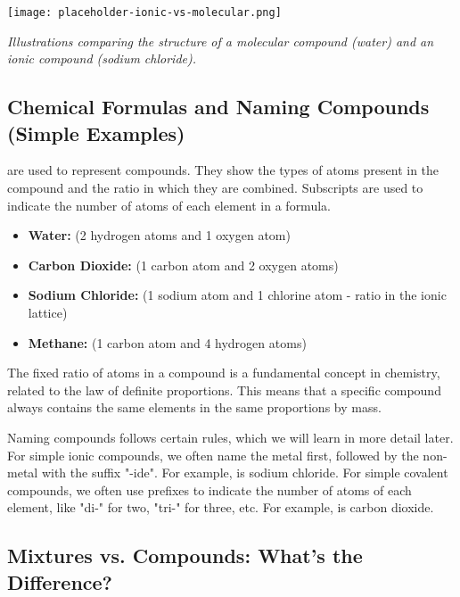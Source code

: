 \begin{marginfigure}
\texttt{[image: placeholder-ionic-vs-molecular.png]}
\caption*{\textit{Illustrations comparing the structure of a molecular compound (water) and an ionic compound (sodium chloride).}}
\end{marginfigure}


\subsection{Chemical Formulas and Naming Compounds (Simple Examples)}

 are used to represent compounds.  They show the types of atoms present in the compound and the ratio in which they are combined.  Subscripts are used to indicate the number of atoms of each element in a formula.

\begin{example}
\begin{itemize}
    \item \textbf{Water:}  (2 hydrogen atoms and 1 oxygen atom)
    \item \textbf{Carbon Dioxide:}  (1 carbon atom and 2 oxygen atoms)
    \item \textbf{Sodium Chloride:}  (1 sodium atom and 1 chlorine atom - ratio in the ionic lattice)
    \item \textbf{Methane:}  (1 carbon atom and 4 hydrogen atoms)
\end{itemize}
\end{example}

\begin{marginnote}
 The fixed ratio of atoms in a compound is a fundamental concept in chemistry, related to the law of definite proportions.  This means that a specific compound always contains the same elements in the same proportions by mass.
\end{marginnote}

Naming compounds follows certain rules, which we will learn in more detail later.  For simple ionic compounds, we often name the metal first, followed by the non-metal with the suffix "-ide".  For example,  is sodium chloride.  For simple covalent compounds, we often use prefixes to indicate the number of atoms of each element, like "di-" for two, "tri-" for three, etc. For example,  is carbon dioxide.

\subsection{Mixtures vs. Compounds: What's the Difference?}

